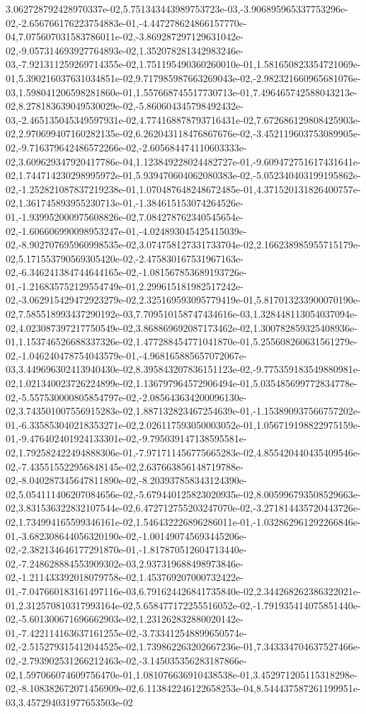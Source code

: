 3.062728792428970337e-02,5.751343443989753723e-03,-3.906895965337753296e-02,-2.656766176223754883e-01,-4.447278624866157770e-04,7.075607031583786011e-02,-3.869287297129631042e-02,-9.057314693927764893e-02,1.352078281342983246e-03,-7.921311259269714355e-02,1.751195490360260010e-01,1.581650823354721069e-01,5.390216037631034851e-02,9.717985987663269043e-02,-2.982321660965681076e-03,1.598041206598281860e-01,1.557668745517730713e-01,7.496465742588043213e-02,8.278183639049530029e-02,-5.860604345798492432e-03,-2.465135045349597931e-02,4.774168878793716431e-02,7.672686129808425903e-02,2.970699407160282135e-02,6.262043118476867676e-02,-3.452119603753089905e-02,-9.716379642486572266e-02,-2.605684474110603333e-02,3.609629347920417786e-04,1.123849228024482727e-01,-9.609472751617431641e-02,1.744714230298995972e-01,5.939470604062080383e-02,-5.052340403199195862e-02,-1.252821087837219238e-01,1.070487648248672485e-01,4.371520131826400757e-02,1.361745893955230713e-01,-1.384615153074264526e-01,-1.939952000975608826e-02,7.084278762340545654e-02,-1.606606990098953247e-01,-4.024893045425415039e-02,-8.902707695960998535e-02,3.074758127331733704e-02,2.166238985955715179e-02,5.171553790569305420e-02,-2.475830167531967163e-02,-6.346241384744644165e-02,-1.081567853689193726e-01,-1.216835752129554749e-01,2.299615181982517242e-02,-3.062915429472923279e-02,2.325169593095779419e-01,5.817013233900070190e-02,7.585518993437290192e-03,7.709510158747434616e-03,1.328448113054037094e-02,4.023087397217750549e-02,3.868869692087173462e-02,1.300782859325408936e-01,1.153746526688337326e-02,1.477288454771041870e-01,5.255608260631561279e-02,-1.046240478754043579e-01,-4.968165885657072067e-03,3.449696302413940430e-02,8.395843207836151123e-02,-9.775359183549880981e-02,1.021340023726224899e-02,1.136797964572906494e-01,5.035485699772834778e-02,-5.557530000805854797e-02,-2.085643634200096130e-02,3.743501007556915283e-02,1.887132823467254639e-01,-1.153890937566757202e-01,-6.335853040218353271e-02,2.026117593050003052e-01,1.056719198822975159e-01,-9.476402401924133301e-02,-9.795039147138595581e-02,1.792582422494888306e-01,-7.971711456775665283e-02,4.855420440435409546e-02,-7.435515522956848145e-02,2.637663856148719788e-02,-8.040287345647811890e-02,-8.203937858343124390e-02,5.054111406207084656e-02,-5.679440125823020935e-02,8.005996793508529663e-02,3.831536322832107544e-02,6.472712755203247070e-02,-3.271814435720443726e-02,1.734994165599346161e-02,1.546432226896286011e-01,-1.032862961292266846e-01,-3.682308644056320190e-02,-1.001490745693445206e-02,-2.382134646177291870e-01,-1.817870512604713440e-02,-7.248628884553909302e-03,2.937319688498973846e-02,-1.211433392018079758e-02,1.453769207000732422e-01,-7.047660183161497116e-03,6.791624426841735840e-02,2.344268262386322021e-01,2.312570810317993164e-02,5.658477172255516052e-02,-1.791935414075851440e-02,-5.601300671696662903e-02,1.231262832880020142e-01,-7.422114163637161255e-02,-3.733412548899650574e-02,-2.515279315412044525e-02,1.739862263202667236e-01,7.343334704637527466e-02,-2.793902531266212463e-02,-3.145035356283187866e-02,1.597066074609756470e-01,1.081076636910438538e-01,3.452971205115318298e-02,-8.108382672071456909e-02,6.113842246122658253e-04,8.544437587261199951e-03,3.457294031977653503e-02
